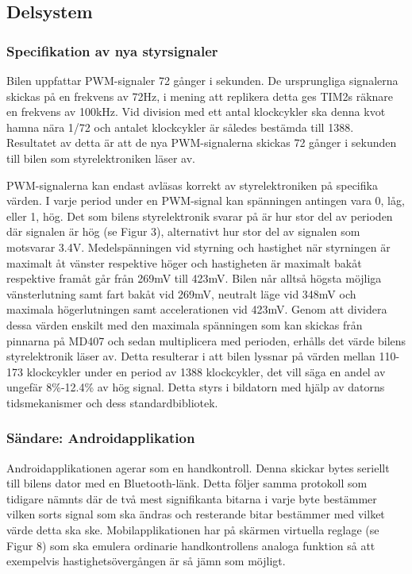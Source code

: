 \documentclass[a4paper]{article}
\begin{document}
\subsection{Delsystem}
\subsubsection{Specifikation av nya styrsignaler}
Bilen uppfattar PWM-signaler 72 gånger i sekunden. De ursprungliga signalerna skickas på en frekvens av 72Hz, i mening att replikera detta ges TIM2s räknare en frekvens av 100kHz. Vid division med ett antal klockcykler ska denna kvot hamna nära 1/72 och antalet klockcykler är således bestämda till 1388. Resultatet av detta är att de nya PWM-signalerna skickas 72 gånger i sekunden till bilen som styrelektroniken läser av.


PWM-signalerna kan endast avläsas korrekt av styrelektroniken på specifika värden. I varje period under en PWM-signal kan spänningen antingen vara 0, låg, eller 1, hög. Det som bilens styrelektronik svarar på är hur stor del av perioden där signalen är hög (se Figur 3),  alternativt hur stor del av signalen som motsvarar 3.4V. Medelspänningen vid styrning och hastighet när styrningen är maximalt åt vänster respektive höger och hastigheten är maximalt bakåt respektive framåt går från 269mV till 423mV. Bilen når alltså högsta möjliga vänsterlutning samt fart bakåt vid 269mV, neutralt läge vid 348mV och maximala högerlutningen samt accelerationen vid 423mV. Genom att dividera dessa värden enskilt med den maximala spänningen som kan skickas från pinnarna på MD407 och sedan multiplicera med perioden, erhålls det värde bilens styrelektronik läser av. Detta resulterar i att bilen lyssnar på värden mellan 110-173 klockcykler under en period av 1388 klockcykler, det vill säga en andel av ungefär 8\%-12.4\% av hög signal. Detta styrs i bildatorn med hjälp av datorns tidsmekanismer och dess standardbibliotek.

\subsubsection{Sändare: Androidapplikation}
Androidapplikationen agerar som en handkontroll. Denna skickar bytes seriellt till bilens dator med en Bluetooth-länk. Detta följer samma protokoll som tidigare nämnts där de två mest signifikanta bitarna i varje byte bestämmer vilken sorts signal som ska ändras och resterande bitar bestämmer med vilket värde detta ska ske. Mobilapplikationen har på skärmen virtuella reglage (se Figur 8) som ska emulera ordinarie handkontrollens analoga funktion så att exempelvis hastighetsövergången är så jämn som möjligt.
\end{document}
